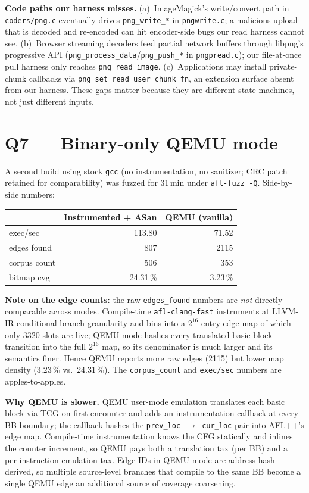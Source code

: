 \documentclass[letterpaper,twocolumn,10pt]{article}
\begin{document}
\textbf{Code paths our harness misses.}
(a)~ImageMagick's write/convert path in \texttt{coders/png.c} eventually drives
\texttt{png\_write\_*} in \texttt{pngwrite.c}; a malicious upload that is decoded
and re-encoded can hit encoder-side bugs our read harness cannot see.
(b)~Browser streaming decoders feed partial network buffers through libpng's
progressive API (\texttt{png\_process\_data}/\texttt{png\_push\_*} in
\texttt{pngpread.c}); our file-at-once pull harness only reaches
\texttt{png\_read\_image}. (c)~Applications may install private-chunk callbacks
via \texttt{png\_set\_read\_user\_chunk\_fn}, an extension surface absent from
our harness. These gaps matter because they are different state machines, not
just different inputs.

\section{Q7 — Binary-only QEMU mode}
\label{sec:q7}
A second build using stock \texttt{gcc} (no instrumentation, no sanitizer; CRC
patch retained for comparability) was fuzzed for 31\,min under
\texttt{afl-fuzz -Q}. Side-by-side numbers:

\begin{center}\small
\begin{tabular}{lrr}
\toprule
& Instrumented + ASan & QEMU (vanilla) \\
\midrule
exec/sec      & 113.80 & 71.52 \\
edges found   & 807    & 2115 \\
corpus count  & 506    & 353 \\
bitmap cvg    & 24.31\,\% & 3.23\,\% \\
\bottomrule
\end{tabular}
\end{center}
\textbf{Note on the edge counts:} the raw \texttt{edges\_found} numbers
are \emph{not} directly comparable across modes. Compile-time
\texttt{afl-clang-fast} instruments at LLVM-IR conditional-branch granularity
and bins into a $2^{16}$-entry edge map of which only $3320$ slots are live;
QEMU mode hashes every translated basic-block transition into the full
$2^{16}$ map, so its denominator is much larger and its semantics finer.
Hence QEMU reports more raw edges (2115) but lower map density (3.23\,\%
vs.\ 24.31\,\%). The \texttt{corpus\_count} and \texttt{exec/sec} numbers
are apples-to-apples.

\noindent
\textbf{Why QEMU is slower.}
QEMU user-mode emulation translates each basic block via TCG on first encounter
and adds an instrumentation callback at every BB boundary; the callback
hashes the \texttt{prev\_loc $\to$ cur\_loc} pair into AFL++'s edge map.
Compile-time instrumentation knows the CFG statically and inlines the
counter increment, so QEMU pays both a translation tax (per BB) and a
per-instruction emulation tax. Edge IDs in QEMU mode are address-hash-derived,
so multiple source-level branches that compile to the same BB become a single
QEMU edge \textemdash{} an additional source of coverage coarsening.
\end{document}
